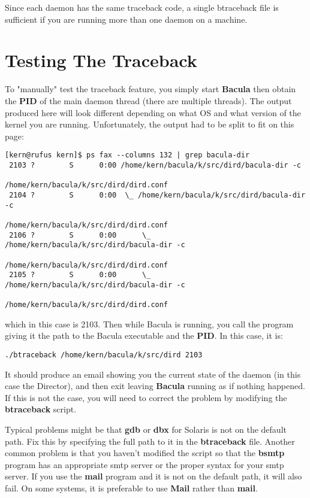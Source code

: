 Since each daemon has the same traceback code, a single btraceback file is
sufficient if you are running more than one daemon on a machine.

\section{Testing The Traceback}

To "manually" test the traceback feature, you simply start {\bf Bacula} then
obtain the {\bf PID} of the main daemon thread (there are multiple threads).
The output produced here will look different depending on what OS and what
version of the kernel you are running.
Unfortunately, the output had to be split to fit on this page:

\footnotesize
\begin{verbatim}
[kern@rufus kern]$ ps fax --columns 132 | grep bacula-dir
 2103 ?        S      0:00 /home/kern/bacula/k/src/dird/bacula-dir -c
                                       /home/kern/bacula/k/src/dird/dird.conf
 2104 ?        S      0:00  \_ /home/kern/bacula/k/src/dird/bacula-dir -c
                                       /home/kern/bacula/k/src/dird/dird.conf
 2106 ?        S      0:00      \_ /home/kern/bacula/k/src/dird/bacula-dir -c
                                       /home/kern/bacula/k/src/dird/dird.conf
 2105 ?        S      0:00      \_ /home/kern/bacula/k/src/dird/bacula-dir -c
                                       /home/kern/bacula/k/src/dird/dird.conf
\end{verbatim}
\normalsize

which in this case is 2103. Then while Bacula is running, you call the program
giving it the path to the Bacula executable and the {\bf PID}. In this case,
it is:

\footnotesize
\begin{verbatim}
./btraceback /home/kern/bacula/k/src/dird 2103
\end{verbatim}
\normalsize

It should produce an email showing you the current state of the daemon (in
this case the Director), and then exit leaving {\bf Bacula} running as if
nothing happened. If this is not the case, you will need to correct the
problem by modifying the {\bf btraceback} script.

Typical problems might be that {\bf gdb} or {\bf dbx} for Solaris is not on
the default path.  Fix this by specifying the full path to it in the {\bf
btraceback} file.  Another common problem is that you haven't modified the
script so that the {\bf bsmtp} program has an appropriate smtp server or
the proper syntax for your smtp server.  If you use the {\bf mail} program
and it is not on the default path, it will also fail.  On some systems, it
is preferable to use {\bf Mail} rather than {\bf mail}.

